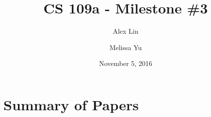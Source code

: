 \documentclass[11pt, margin=1in]{article}
\begin{document}
\title{CS 109a - Milestone \#3}
\author{Alex Lin \and Melissa Yu}
\date{November 5, 2016}
\maketitle

\section{Summary of Papers}
\end{document}
